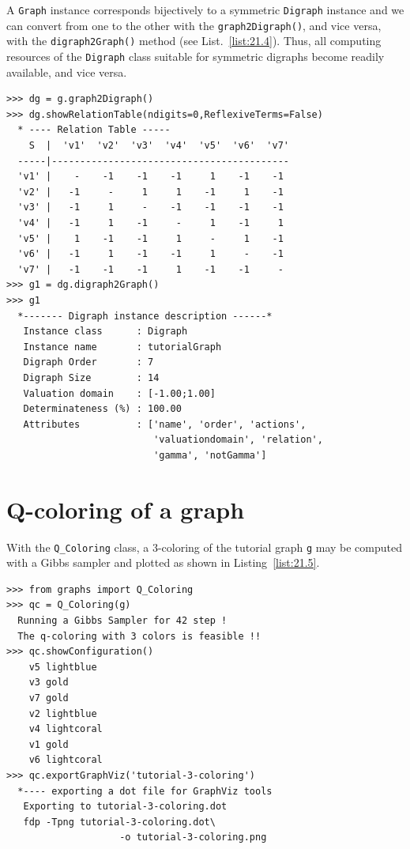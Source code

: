 A \texttt{Graph} instance corresponds bijectively to a symmetric \texttt{Digraph} instance and we can convert from one to the other with the \texttt{graph2Digraph()}, and vice versa, with the \texttt{digraph2Graph()} method (see List.~\vref{list:21.4}). Thus, all computing resources of the \texttt{Digraph} class suitable for symmetric digraphs become readily available, and vice versa.
\begin{lstlisting}[caption={Conversion between graphs and digraphs},label=list:21.4]
>>> dg = g.graph2Digraph()
>>> dg.showRelationTable(ndigits=0,ReflexiveTerms=False)
  * ---- Relation Table -----
    S  |  'v1'  'v2'  'v3'  'v4'  'v5'  'v6'  'v7'	  
  -----|------------------------------------------
  'v1' |    -    -1    -1    -1     1    -1    -1	 
  'v2' |   -1     -     1     1    -1     1    -1	 
  'v3' |   -1     1     -    -1    -1    -1    -1	 
  'v4' |   -1     1    -1     -     1    -1     1	 
  'v5' |    1    -1    -1     1     -     1    -1	 
  'v6' |   -1     1    -1    -1     1     -    -1	 
  'v7' |   -1    -1    -1     1    -1    -1     -
>>> g1 = dg.digraph2Graph()
>>> g1
  *------- Digraph instance description ------*
   Instance class      : Digraph
   Instance name       : tutorialGraph
   Digraph Order       : 7
   Digraph Size        : 14
   Valuation domain    : [-1.00;1.00]
   Determinateness (%) : 100.00
   Attributes          : ['name', 'order', 'actions',
                          'valuationdomain', 'relation',
                          'gamma', 'notGamma']
\end{lstlisting}

\section{Q-coloring of a graph}
\label{25.2}

With the \texttt{Q\_Coloring} class, a 3-coloring of the tutorial graph \texttt{g} may be computed with a Gibbs sampler \citep{GEM-1984} and plotted as shown in Listing~\vref{list:21.5}.
\begin{lstlisting}[caption={Computing a 3-coloring of the random graph \texttt{g}},label=list:21.5]
>>> from graphs import Q_Coloring
>>> qc = Q_Coloring(g)
  Running a Gibbs Sampler for 42 step !
  The q-coloring with 3 colors is feasible !!
>>> qc.showConfiguration()
    v5 lightblue
    v3 gold
    v7 gold
    v2 lightblue
    v4 lightcoral
    v1 gold
    v6 lightcoral
>>> qc.exportGraphViz('tutorial-3-coloring')
  *---- exporting a dot file for GraphViz tools
   Exporting to tutorial-3-coloring.dot
   fdp -Tpng tutorial-3-coloring.dot\
                    -o tutorial-3-coloring.png
\end{lstlisting}

